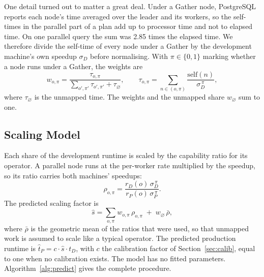 \documentclass[runningheads]{llncs}
\begin{document}
One detail turned out to matter a great deal. Under a Gather node, PostgreSQL
reports each node's time averaged over the leader and its workers, so the
self-times in the parallel part of a plan add up to processor time and not to
elapsed time. On one parallel query the sum was 2.85 times the elapsed time.
We therefore divide the self-time of every node under a Gather by the
development machine's own speedup $\sigma_D$ before normalising. With $\pi
\in \{0,1\}$ marking whether a node runs under a Gather, the weights are
\begin{equation}
w_{o,\pi} = \frac{\tau_{o,\pi}}{\sum_{o',\pi'} \tau_{o',\pi'} + \tau_{\varnothing}},
\qquad
\tau_{o,\pi} = \sum_{n \in (o,\pi)} \frac{\text{self}(n)}{\sigma_D^{\,\pi}},
\end{equation}
where $\tau_{\varnothing}$ is the unmapped time. The weights and the unmapped
share $w_{\varnothing}$ sum to one.

\subsection{Scaling Model}

Each share of the development runtime is scaled by the capability ratio for
its operator. A parallel node runs at the per-worker rate multiplied by the
speedup, so its ratio carries both machines' speedups:
\begin{equation}
\rho_{o,\pi} = \frac{r_D(o)\,\sigma_D^{\,\pi}}{r_P(o)\,\sigma_P^{\,\pi}} .
\end{equation}
The predicted scaling factor is
\begin{equation}
\hat{s} = \sum_{o,\pi} w_{o,\pi}\,\rho_{o,\pi} \;+\; w_{\varnothing}\,\bar{\rho},
\label{eq:model}
\end{equation}
where $\bar{\rho}$ is the geometric mean of the ratios that were used, so that
unmapped work is assumed to scale like a typical operator. The predicted
production runtime is $\hat{t}_P = c \cdot \hat{s} \cdot t_D$, with $c$ the
calibration factor of Section~\ref{sec:calib}, equal to one when no
calibration exists. The model has no fitted parameters. Algorithm~\ref{alg:predict}
gives the complete procedure.
\end{document}
